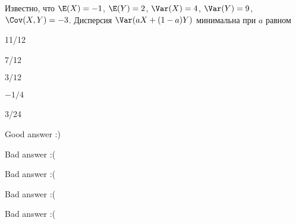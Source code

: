 
\begin{question}
Известно, что \(\E(X)=-1\), \(\E(Y)=2\), \(\Var(X)=4\), \(\Var(Y)=9\),
\(\Cov(X,Y)=-3\). Дисперсия \(\Var(aX+(1-a)Y)\) минимальна при \(a\)
равном
\begin{answerlist}
  \item 11/12
  \item 7/12
  \item \(3/12\)
  \item \(-1/4\)
  \item 3/24
\end{answerlist}
\end{question}

\begin{solution}
\begin{answerlist}
  \item Good answer :)
  \item Bad answer :(
  \item Bad answer :(
  \item Bad answer :(
  \item Bad answer :(
\end{answerlist}
\end{solution}

